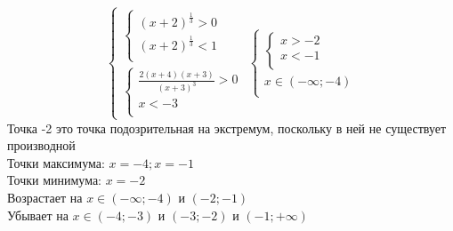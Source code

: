 \documentclass{article}
\begin{document}
    \begin{equation*}
    \begin{cases}
        \begin{cases}
            (x+2)^\frac{1}{3} > 0 \\
            (x+2)^\frac{1}{3} < 1 \\            
        \end{cases} \\
        \begin{cases}
            \frac{2(x+4)(x+3)}{(x+3)^3} > 0 \\
            x < -3 \\          
        \end{cases}
    \end{cases}
    \begin{cases}
        \begin{cases}
            x > -2 \\
            x < -1 \\            
        \end{cases} \\
        x \in (- \infty; -4) \\
      \end{cases} 
    \end{equation*}
    Точка -2 это точка подозрительная на экстремум, поскольку в ней не существует производной \\
    Точки максимума: $x=-4; x=-1$ \\
    Точки минимума: $x=-2$ \\
    Возрастает на $x \in (- \infty; -4)$ и $(-2;-1)$ \\
    Убывает на $x \in (-4;-3)$ и $(-3;-2)$ и $(-1; + \infty)$
    
\end{document}
